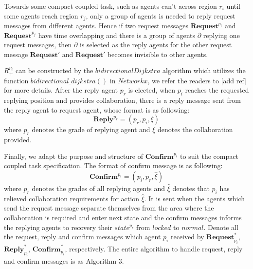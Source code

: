 \documentclass[journal]{IEEEtran}
\begin{document}
Towards some compact coupled task, such as agents can't across region $r_i$ until some agents reach region $r_j$, only a group of agents is needed to reply request messages from different agents. Hence if two request messages $\textbf{Request}^{p_i}$ and $\textbf{Request}^{p_j}$ have time overlapping and there is a group of agents $\partial$ replying one request messages, then $\partial$ is selected as the reply agents for the other request message $\textbf{Request}'$ and $\textbf{Request}'$ becomes invisible to other agents.\par
$R^{p_i}_+$ can be constructed by the $bidirectional Dijkstra$ algorithm which utilizes the function $bidirectional\_dijkstra()$ in $Networkx$, we refer the readers to [add ref] for more details. After the reply agent $p_r$ is elected, when $p_i$ reaches the requested replying position and provides collaboration, there is a reply message sent from the reply agent to request agent, whose format is as following:
$$\textbf{Reply}^{p_r}=(p_r,p_i,\xi)$$
where $p_r$ denotes the grade of replying agent and $\xi$ denotes the collaboration provided.\par
Finally, we adapt the purpose and structure of $\textbf{Confirm}^{p_i}$ to suit the compact coupled task specification. The format of confirm message is as following:
$$\textbf{Confirm}^{p_i}=(p_i,p_r,\hat{\xi})$$
where $p_r$ denotes the grades of all replying agents and $\hat{\xi}$ denotes that $p_i$ has relieved collaboration requirements for action $\hat{\xi}$. It is sent when the agents which send the request message separate themselves from the area where the collaboration is required and enter next state and the confirm messages informs the replying agents to recovery their $state^{p_r}$ from $locked$ to $normal$. Denote all the request, reply and confirm messages which agent $p_i$ received by $\textbf{Request}_{p_i}^{\ast}$, $\textbf{Reply}_{p_i}^{\ast}$, $\textbf{Confirm}_{p_i}^{\ast}$, respectively. The entire algorithm to handle request, reply and confirm messages is as Algorithm 3.
\end{document}
